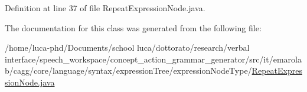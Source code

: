 Definition at line 37 of file Repeat\-Expression\-Node.\-java.



The documentation for this class was generated from the following file\-:\begin{DoxyCompactItemize}
\item 
/home/luca-\/phd/\-Documents/school luca/dottorato/research/verbal interface/speech\-\_\-workspace/concept\-\_\-action\-\_\-grammar\-\_\-generator/src/it/emarolab/cagg/core/language/syntax/expression\-Tree/expression\-Node\-Type/\hyperlink{RepeatExpressionNode_8java}{Repeat\-Expression\-Node.\-java}\end{DoxyCompactItemize}
